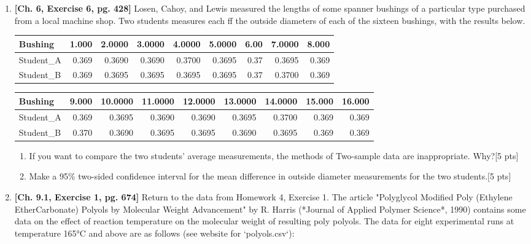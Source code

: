 \documentclass[11pt]{article}\usepackage[]{graphicx}\usepackage[]{color}
\begin{document}
{\begin{enumerate}
\begin{enumerate}
  \item Make and interpret a $90 \%$ two-sided confidence interval for the mean runout for laid gears.[5 pts]
\end{enumerate}

\item \textbf{[Ch. 6, Exercise 6, pg. 428]} Losen, Cahoy, and Lewis measured the lengths of some spanner bushings of a particular type purchased from a local machine shop. Two students measures each ff the outside diameters of each of the sixteen bushings, with the results below.



\begin{tabular}{l|r|r|r|r|r|r|r|r}
\centering
\hline
Bushing & 1.000 & 2.0000 & 3.0000 & 4.0000 & 5.0000 & 6.00 & 7.0000 & 8.000\\
\hline
Student\_A & 0.369 & 0.3690 & 0.3690 & 0.3700 & 0.3695 & 0.37 & 0.3695 & 0.369\\
\hline
Student\_B & 0.369 & 0.3695 & 0.3695 & 0.3695 & 0.3695 & 0.37 & 0.3700 & 0.369\\
\hline
\end{tabular}

\begin{tabular}{l|r|r|r|r|r|r|r|r}
\centering
\hline
Bushing & 9.000 & 10.0000 & 11.0000 & 12.0000 & 13.0000 & 14.0000 & 15.000 & 16.000\\
\hline
Student\_A & 0.369 & 0.3695 & 0.3690 & 0.3690 & 0.3695 & 0.3700 & 0.369 & 0.369\\
\hline
Student\_B & 0.370 & 0.3690 & 0.3695 & 0.3695 & 0.3690 & 0.3695 & 0.369 & 0.369\\
\hline
\end{tabular}

\begin{enumerate}
\item If you want to compare the two students' average measurements, the methods of Two-sample data are inappropriate. Why?[5 pts]
    
\item Make a 95\% two-sided confidence interval for the mean difference in outside diameter measurements for the two students.[5 pts]
    
\end{enumerate}

\item \textbf{[Ch. 9.1, Exercise 1, pg. 674] }Return to the data from Homework 4, Exercise 1. The article "Polyglycol Modified Poly (Ethylene EtherCarbonate) Polyols by Molecular Weight Advancement" by R. Harris (*Journal of Applied Polymer Science*, 1990) contains some data on the effect of reaction temperature on the molecular weight of resulting poly polyols. The data for eight experimental runs at temperature 165°C and above are as follows (see website for `polyols.csv`):


\end{enumerate}}
\end{document}
